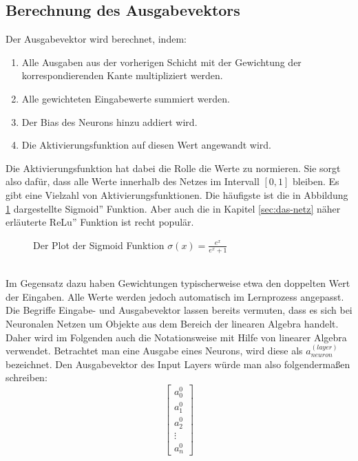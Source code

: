 \documentclass[11pt]{article}
\begin{document}
\subsection{Berechnung des Ausgabevektors}
Der Ausgabevektor wird berechnet, indem:
\begin{enumerate}
	\item Alle Ausgaben aus der vorherigen Schicht mit der Gewichtung der korrespondierenden Kante multipliziert werden.
	\item Alle gewichteten Eingabewerte summiert werden.
	\item Der Bias des Neurons hinzu addiert wird.
	\item Die Aktivierungsfunktion auf diesen Wert angewandt wird.
\end{enumerate}
Die Aktivierungsfunktion hat dabei die Rolle die Werte zu normieren. Sie sorgt also dafür, dass alle Werte innerhalb des Netzes im Intervall $[0, 1]$ bleiben. Es gibt eine Vielzahl von Aktivierungsfunktionen. Die häufigste ist die in Abbildung \ref{Sigmoid} dargestellte \glqq Sigmoid'' Funktion. Aber auch die in Kapitel \ref{sec:das-netz} näher erläuterte \glqq ReLu'' Funktion ist recht populär.
\begin{figure}[h]
\begin{center}
\end{center}
\caption{Der Plot der Sigmoid Funktion $\sigma(x)=\frac{e^x}{e^x+1}$}
\label{Sigmoid}
\end{figure}
\\
Im Gegensatz dazu haben Gewichtungen typischerweise etwa den doppelten Wert der Eingaben. Alle Werte werden jedoch automatisch im Lernprozess angepasst.
\\
Die Begriffe Eingabe- und Ausgabevektor lassen bereits vermuten, dass es sich bei Neuronalen Netzen um Objekte aus dem Bereich der linearen Algebra handelt. Daher wird im Folgenden auch die Notationsweise mit Hilfe von linearer Algebra verwendet. Betrachtet man eine Ausgabe eines Neurons, wird diese als $a^ {(layer)}_{neuron}$ bezeichnet. Den Ausgabevektor des Input Layers würde man also folgendermaßen schreiben:
\begin{equation*}
\begin{bmatrix}
	a^0_0\\
	a^0_1\\
	a^0_2\\
	\vdots\\
	a^0_n
\end{bmatrix}
\end{equation*}
\end{document}
